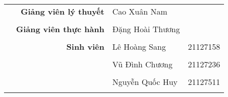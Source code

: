 \documentclass[12pt, a4paper]{article}
\begin{document}
\begin{titlepage}
    \centerline{
    }
    \raggedright
    \bigskip
    \begin{center}
        \begin{table}[h]
            \begin{tabular}{rrlc}
                 & \large{\textbf{Giảng viên lý thuyết}} & \large{Cao Xuân Nam}      &          \\ \\
                 & \large{\textbf{Giảng viên thực hành}} & \large{Đặng Hoài Thương}  &          \\ \\
                 & \large{\textbf{Sinh viên}}        & \large{Lê Hoàng Sang}        & \large{21127158}  \\ \\
                 & \large{\textbf{}}                 & \large{Vũ Đình Chương}       & \large{21127236}  \\ \\
                 & \large{\textbf{}}                 & \large{Nguyễn Quốc Huy}      & \large{21127511}  \\ \\
            \end{tabular}
        \end{table}
    \end{center}
\end{titlepage}




\pagestyle{fancy}
\fancyhf{}
\addtolength{\topmargin}{-0.70894pt}
\setlength{\headheight}{12.70894pt}

\rfoot{\textbf{\thepage}}

\renewcommand*{\contentsname}{Mục lục}
\tableofcontents

\pagebreak
\end{document}
